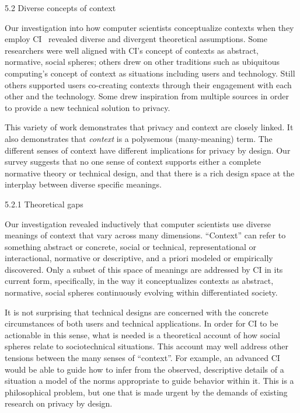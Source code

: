 \documentclass[../thesis.tex]{subfiles}
\begin{document}
5.2 Diverse concepts of context

Our investigation into how computer scientists conceptualize contexts
when they employ CI \ revealed diverse and divergent theoretical
assumptions. Some researchers were well aligned with
CI's concept of contexts as abstract, normative, social
spheres; others drew on other traditions such as ubiquitous
computing's concept of context as situations including
users and technology. Still others supported users co-creating contexts
through their engagement with each other and the technology. Some drew
inspiration from multiple sources in order to provide a new technical
solution to privacy.

This variety of work demonstrates that privacy and context are closely
linked. It also demonstrates that \textit{context }is a polysemous
(many-meaning) term. The different senses of context have different
implications for privacy by design. Our survey suggests that no one
sense of context supports either a complete normative theory or
technical design, and that there is a rich design space at the
interplay between diverse specific meanings.

{\color[rgb]{0.2627451,0.2627451,0.2627451}
5.2.1 Theoretical gaps}

Our investigation revealed inductively that computer scientists use
diverse meanings of context that vary across many dimensions.
``Context'' can refer to something
abstract or concrete, social or technical, representational or
interactional, normative or descriptive, and a priori modeled or
empirically discovered. Only a subset of this space of meanings are
addressed by CI in its current form, specifically, in the way it
conceptualizes contexts as abstract, normative, social spheres
continuously evolving within differentiated society.

It is not surprising that technical designs are concerned with the
concrete circumstances of both users and technical applications. In
order for CI to be actionable in this sense, what is needed is a
theoretical account of how social spheres relate to sociotechnical
situations. This account may well address other tensions between the
many senses of ``context''. For
example, an advanced CI would be able to guide how to infer from the
observed, descriptive details of a situation a model of the norms
appropriate to guide behavior within it. This is a philosophical
problem, but one that is made urgent by the demands of existing
research on privacy by design.
\end{document}
